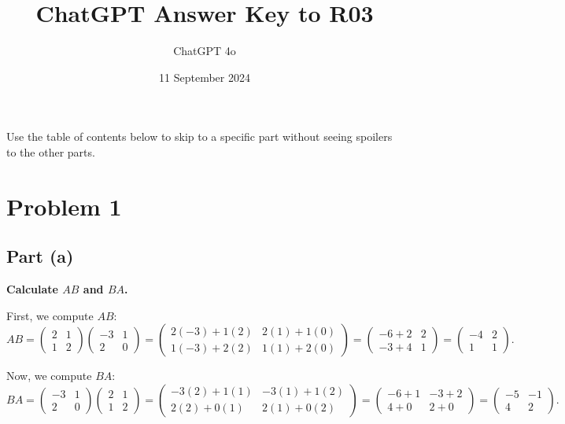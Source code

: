 \documentclass[11pt]{article}
\begin{document}
\title{ChatGPT Answer Key to R03}
\author{ChatGPT 4o}
\date{11 September 2024}
\maketitle

Use the table of contents below to skip to a specific part
without seeing spoilers to the other parts.

\tableofcontents

\newpage

\section{Problem 1}
\subsection{Part (a)}
\textbf{Calculate $AB$ and $BA$.}

First, we compute $AB$:
\[
AB = \begin{pmatrix} 2 & 1 \\ 1 & 2 \end{pmatrix} \begin{pmatrix} -3 & 1 \\ 2 & 0 \end{pmatrix}
= \begin{pmatrix} 2(-3) + 1(2) & 2(1) + 1(0) \\ 1(-3) + 2(2) & 1(1) + 2(0) \end{pmatrix}
= \begin{pmatrix} -6 + 2 & 2 \\ -3 + 4 & 1 \end{pmatrix}
= \begin{pmatrix} -4 & 2 \\ 1 & 1 \end{pmatrix}.
\]

Now, we compute $BA$:
\[
BA = \begin{pmatrix} -3 & 1 \\ 2 & 0 \end{pmatrix} \begin{pmatrix} 2 & 1 \\ 1 & 2 \end{pmatrix}
= \begin{pmatrix} -3(2) + 1(1) & -3(1) + 1(2) \\ 2(2) + 0(1) & 2(1) + 0(2) \end{pmatrix}
= \begin{pmatrix} -6 + 1 & -3 + 2 \\ 4 + 0 & 2 + 0 \end{pmatrix}
= \begin{pmatrix} -5 & -1 \\ 4 & 2 \end{pmatrix}.
\]
\end{document}
